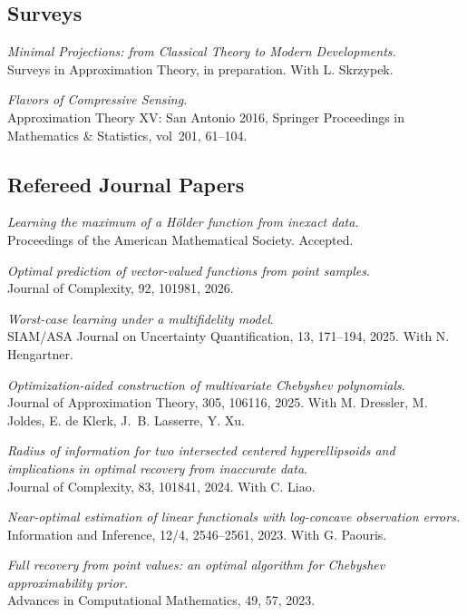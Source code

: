 \documentclass[11pt]{article}
\begin{document}
\subsection{Surveys}
\betaremune
\item {\sl Minimal Projections:
from Classical Theory to Modern Developments.}\\
Surveys in Approximation Theory, in preparation. With L. Skrzypek.
\item {\sl Flavors of Compressive Sensing}.\\
Approximation Theory XV: San Antonio 2016,
Springer Proceedings in Mathematics \& Statistics,
vol~201, 61--104. 
\eetaremune

\subsection{Refereed Journal Papers}
\betaremune
\item {\sl Learning the maximum of a H\"older function from inexact data}.\\
Proceedings of the American Mathematical Society. Accepted.
\item {\sl Optimal prediction of vector-valued functions from point samples}.\\
Journal of Complexity, 92, 101981, 2026. 
\item {\sl Worst-case learning under a multifidelity model}.\\
SIAM/ASA Journal on Uncertainty Quantification, 13, 171--194, 2025. With N. Hengartner.
\item {\sl Optimization-aided construction of multivariate Chebyshev polynomials}.\\
Journal of Approximation Theory, 305, 106116, 2025. With M.  Dressler, M.  Joldes, E. de Klerk, J.~B. Lasserre,  Y. Xu.
\item {\sl Radius of information for two intersected centered hyperellipsoids and implications in optimal recovery from inaccurate data}. \\
Journal of Complexity, 83, 101841, 2024. With C. Liao.
\item {\sl Near-optimal estimation of linear functionals with log-concave observation errors.}\\
Information and Inference, 12/4, 2546--2561, 2023.  
With G. Paouris.
\item {\sl Full recovery from point values: an optimal algorithm for Chebyshev approximability prior.}\\
Advances in Computational Mathematics,  49, 57, 2023.	
\end{document}
